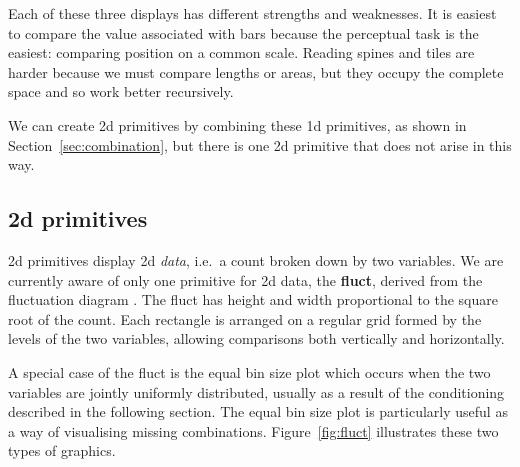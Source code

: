 \documentclass[journal]{vgtc}
\begin{document}
Each of these three displays has different strengths and weaknesses. It is easiest to compare the value associated with bars because the perceptual task is the easiest: comparing position on a common scale. Reading spines and tiles are harder because we must compare lengths or areas, but they occupy the complete space and so work better recursively. 

We can create 2d primitives by combining these 1d primitives, as shown in Section~\ref{sec:combination}, but there is one 2d primitive that does not arise in this way.

\subsection{2d primitives}
\label{sub:part-2d}

2d primitives display 2d \emph{data}, i.e.\ a count broken down by two variables. We are currently aware of only one primitive for 2d data, the {\bf fluct}, derived from the fluctuation diagram \citep{hofmann:2000}. The fluct has height and width proportional to the square root of the count. Each rectangle is arranged on a regular grid formed by the levels of the two variables, allowing comparisons both vertically and horizontally.

A special case of the fluct is the equal bin size plot \citep{hofmann:2000} which occurs when the two variables are jointly uniformly distributed, usually as a result of the conditioning described in the following section. The equal bin size plot is particularly useful as a way of visualising missing combinations. Figure~\ref{fig:fluct} illustrates these two types of graphics.
\end{document}
